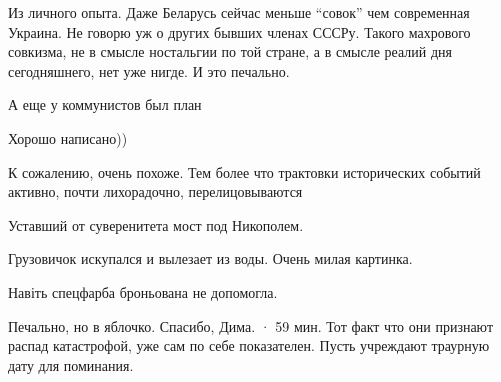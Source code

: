  
 
 
 
 
\zzSecCmt

\begin{itemize} %

Из личного опыта. Даже Беларусь сейчас меньше \enquote{совок} чем современная Украина.
Не говорю уж о других бывших членах СССРу. Такого махрового совкизма, не в
смысле ностальгии по той стране, а в смысле реалий дня сегодняшнего, нет уже
нигде. И это печально.

А еще у коммунистов был план

Хорошо написано))

К сожалению, очень похоже. Тем более что трактовки исторических событий активно, почти лихорадочно, перелицовываются

Уставший от суверенитета мост под Никополем.

Грузовичок искупался и вылезает из воды. Очень милая картинка.

Навіть спецфарба броньована не допомогла.

Печально, но в яблочко. Спасибо, Дима.
 · 59 мин.
Тот факт что они признают распад катастрофой, уже сам по себе показателен. Пусть учреждают траурную дату для поминания.
\end{itemize} %
